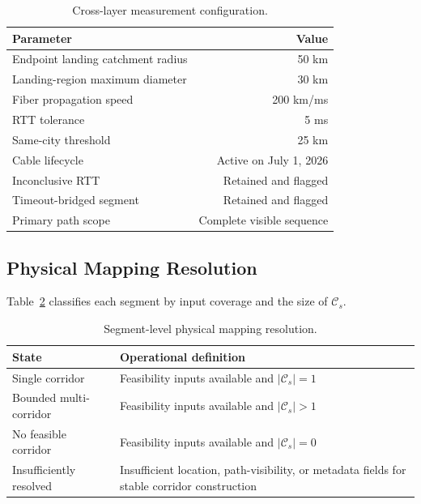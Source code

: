 \begin{table}[!t]
  \centering
  \caption{Cross-layer measurement configuration.}
  \label{tab:measurement-configuration}
  \footnotesize
  \setlength{\tabcolsep}{3.6pt}
  \begin{tabular}{lr}
    \toprule
    Parameter & Value \\
    \midrule
    Endpoint landing catchment radius & 50 km \\
    Landing-region maximum diameter & 30 km \\
    Fiber propagation speed & 200 km/ms \\
    RTT tolerance & 5 ms \\
    Same-city threshold & 25 km \\
    Cable lifecycle & Active on July 1, 2026 \\
    Inconclusive RTT & Retained and flagged \\
    Timeout-bridged segment & Retained and flagged \\
    Primary path scope & Complete visible sequence \\
    \bottomrule
  \end{tabular}
\end{table}

\subsection{Physical Mapping Resolution}
\label{sec:framework_mapping_resolution}

Table~\ref{tab:mapping-resolution} classifies each segment by input coverage and
the size of \(\mathcal{C}_s\).

\begin{table}[!t]
  \centering
  \caption{Segment-level physical mapping resolution.}
  \label{tab:mapping-resolution}
  \footnotesize
  \setlength{\tabcolsep}{3.2pt}
  \begin{tabular}{p{}p{}}
    \toprule
    State & Operational definition \\
    \midrule
    Single corridor
      & Feasibility inputs available and \(|\mathcal{C}_s|=1\) \\
    Bounded multi-corridor
      & Feasibility inputs available and \(|\mathcal{C}_s|>1\) \\
    No feasible corridor
      & Feasibility inputs available and \(|\mathcal{C}_s|=0\) \\
    Insufficiently resolved
      & Insufficient location, path-visibility, or metadata fields for stable
        corridor construction \\
    \bottomrule
  \end{tabular}
\end{table}

